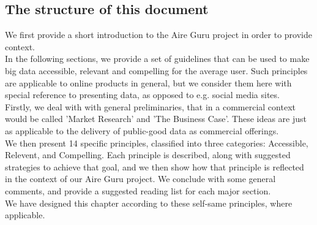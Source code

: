 \subsection{The structure of this document}

We first provide a short introduction to the Aire Guru project in order to provide context. \\

In the following sections, we provide a set of guidelines that can be used to make big data
accessible, relevant and compelling for the average user. Such principles are applicable to 
online products in general, but we consider them here with special reference to presenting
data, as opposed to e.g. social media sites. \\

Firstly, we deal with with general preliminaries, that in a commercial context would be called
'Market Research' and 'The Business Case'. These ideas are just as applicable to the delivery of
public-good data as commercial offerings. \\

We then present 14 specific principles, classified into three categories: Accessible, Relevent, and Compelling.
Each principle is described, along with suggested strategies to achieve that goal, and we then show
how that principle is reflected in the context of our Aire Guru project. We conclude with some
general comments, and provide a suggested reading list for each major section. \\

We have designed this chapter according to these self-same principles, where applicable.
